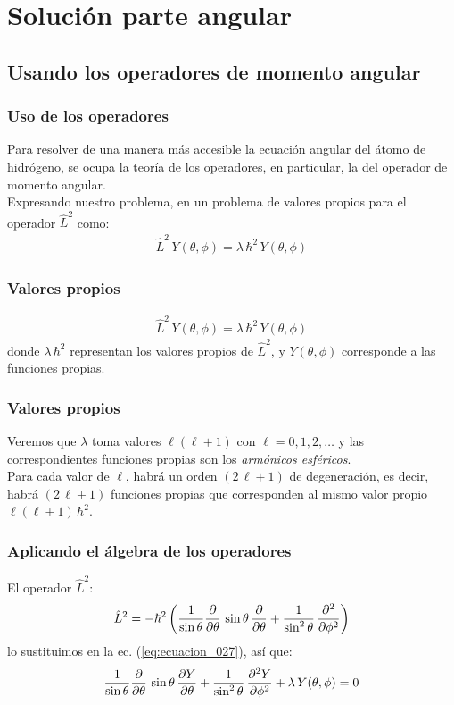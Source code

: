 \documentclass[12pt]{beamer}
\begin{document}
\section{Solución parte angular}
\subsection{Usando los operadores de momento angular}

\begin{frame}
\frametitle{Uso de los operadores}
Para resolver de una manera más accesible la ecuación angular del átomo de hidrógeno, se ocupa la teoría de los operadores, en particular, la del operador de momento angular.
\\
\bigskip
Expresando nuestro problema, en un problema de valores propios para el operador $\hat{L}^{2}$ como:
\begin{align}
\hat{L}^{2} \, Y(\theta, \phi) = \lambda \, \hbar^{2} \, Y(\theta, \phi)
\label{eq:ecuacion_027}
\end{align}
\end{frame}
\begin{frame}
\frametitle{Valores propios}
\begin{align*}
\hat{L}^{2} \, Y(\theta, \phi) = \lambda \, \hbar^{2} \, Y(\theta, \phi)
\end{align*}    
donde $\lambda \, \hbar^{2}$ representan los valores propios de $\hat{L}^{2}$, y $Y(\theta, \phi)$ corresponde a las funciones propias. 
\end{frame}
\begin{frame}
\frametitle{Valores propios}
Veremos que $\lambda$ toma valores $\ell (\ell + 1)$ con $\ell = 0, 1, 2, \ldots$ y las correspondientes funciones propias son los \emph{armónicos esféricos}.
\\
\bigskip
\pause
Para cada valor de $\ell$, habrá un orden $(2 \, \ell + 1)$ de degeneración, es decir, habrá $(2 \, \ell + 1)$ funciones propias que corresponden al mismo valor propio $\ell (\ell + 1) \, \hbar^{2}$.
\end{frame}
\begin{frame}
\frametitle{Aplicando el álgebra de los operadores}
El operador $\hat{L}^{2}$:
\begin{align*}
\hat{L}^{2} = - \hbar^{2} \left( \dfrac{1}{\sin \theta} \pdv{\theta} \, \sin \theta \, \pdv{\theta} + \dfrac{1}{\sin^{2} \theta} \, \pdv[2]{\phi} \right)
\end{align*}
\pause
lo sustituimos en la ec. (\ref{eq:ecuacion_027}), así que:
\begin{align}
    \dfrac{1}{\sin \theta} \pdv{\theta} \, \sin \theta \, \pdv{Y}{\theta} + \dfrac{1}{\sin^{2} \theta} \, \pdv[2]{Y}{\phi} + \lambda \, Y(\theta, \phi) = 0
\end{align}
\end{frame}
\end{document}
